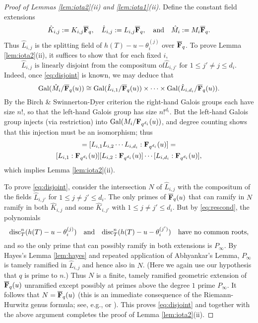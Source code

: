 \documentclass[a4paper]{compositio}
\begin{document}
\begin{proof}[Proof of Lemmas \ref{lem:iota2}(ii) and \ref{lem:iota1}(ii)]
Define the constant field extensions \[ \hat{K}_{i,j} := K_{i,j}
\overline{\mathbf{F}}_q, \quad \hat{L}_{i,j} := L_{i,j}
\overline{\mathbf{F}}_q,\quad \text{and}\quad \hat{M}_{i} := M_i
\overline{\mathbf{F}}_q.\] Thus $\hat{L}_{i,j}$ is the splitting field of
$h(T) - u - \theta_i^{(j)}$ over $\overline{\mathbf{F}}_q$. To prove Lemma
\ref{lem:iota2}(ii), it suffices to show that for each fixed $i$,
\begin{equation}\label{eq:disjoint}
\hat{L}_{i,j} \text{ is linearly disjoint from the compositum of
$\hat{L}_{i,j'}$ for $1 \leq j' \neq j \leq d_i$.}
\end{equation} Indeed, once \eqref{eq:disjoint} is known, we may
deduce that
\[ \mathrm{Gal}(\hat{M}_i/\overline{\mathbf{F}}_q(u)) \cong \mathrm{Gal}(\hat{L}_{i,1}/\overline{\mathbf{F}}_q(u)) \times \dots
\times \mathrm{Gal}(\hat{L}_{i,d_i}/\overline{\mathbf{F}}_q(u)). \] By the Birch \&
Swinnerton-Dyer criterion the right-hand Galois groups each have
size $n!$, so that the left-hand Galois group has size $n!^{d_i}$.
But the left-hand Galois group injects (via restriction) into
$\mathrm{Gal}(M_i/\mathbf{F}_{q^{d_i}}(u))$, and degree counting shows that this
injection must be an isomorphism; thus
\begin{multline*} [M_i: \F_{q^{d_i}}(u)] = [L_{i,1} L_{i,2} \cdots L_{i, d_i}: \F_{q^{d_i}}(u)] = \\
[L_{i,1}: \F_{q^{d_i}}(u)] [L_{i,2}: \F_{q^{d_i}}(u)] \cdots
[L_{i,d_i}: \F_{q^{d_i}}(u)],
\end{multline*}
which implies Lemma \ref{lem:iota2}(ii).

To prove \eqref{eq:disjoint}, consider the intersection $N$ of
$\hat{L}_{i,j}$ with the compositum of the fields $\hat{L}_{i,j'}$
for $1 \leq j \neq j' \leq d_i$. The only primes of
$\overline{\mathbf{F}}_q(u)$ that can ramify in $N$ ramify in both
$\hat{K}_{i,j}$ and some $\hat{K}_{i,j'}$ with $1 \leq j \neq j'
\leq d_i$. But by \eqref{eq:rescond}, the polynomials
\[ \mathrm{disc}_{T}^{n}(h(T) - u - \theta_i^{(j)}) \quad \text{and} \quad
\mathrm{disc}_{T}^{n}(h(T) - u - \theta_i^{(j')}) \quad \text{have no common
roots},
\] and so the only prime that can possibly ramify in both extensions is $P_{\infty}$. By
Hayes's Lemma \ref{lem:hayes} and repeated application of
Abhyankar's Lemma, $P_{\infty}$ is tamely ramified in
$\hat{L}_{i,j}$ and hence also in $N$. (Here we again use our
hypothesis that $q$ is prime to $n$.) Thus $N$ is a finite, tamely
ramified geometric extension of $\overline{\mathbf{F}}_q(u)$ unramified
except possibly at primes above the degree $1$ prime $P_{\infty}$.
It follows that $N= \overline{\mathbf{F}}_q(u)$ (this is an immediate
consequence of the Riemann-Hurwitz genus formula; see, e.g.,
\cite[p.460]{hayes73} or \cite[Exercise 6, p.99]{rosen02}). This
proves \eqref{eq:disjoint} and together with the above argument
completes the proof of Lemma \ref{lem:iota2}(ii).


\end{proof}
\end{document}
